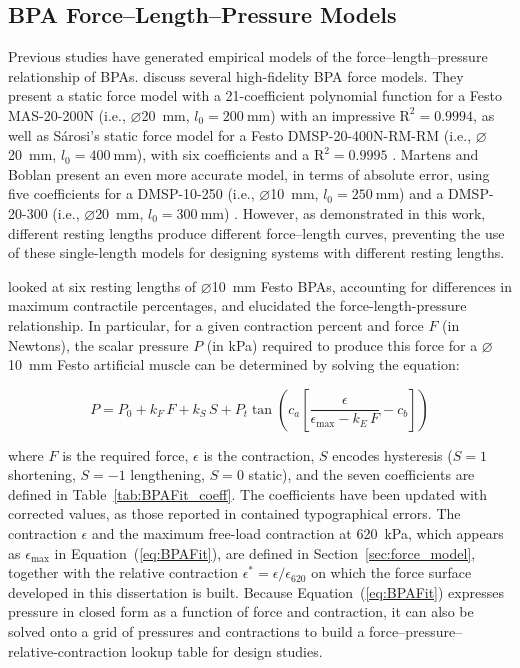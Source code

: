 \subsection{BPA Force--Length--Pressure Models}\label{sec:bg_bpamodels}

Previous studies have generated empirical models of the force--length--pressure relationship of BPAs. \citet{sarosi_comparative_2017} discuss several high-fidelity BPA force models. They present a static force model with a 21-coefficient polynomial function for a Festo MAS-20-200N (i.e., $\diameter$\qty{20}{\mm}, $l_0=\qty{200}{\mm}$) with an impressive $\text{R}^2=0.9994$, as well as S\'arosi's static force model for a Festo DMSP-20-400N-RM-RM (i.e., $\diameter$\qty{20}{\mm}, $l_0=\qty{400}{\mm}$), with six coefficients and a $\text{R}^2=0.9995$ \citep{sarosi_new_2012, sarosi_investigation_2013}. Martens and Boblan present an even more accurate model, in terms of absolute error, using five coefficients for a DMSP-10-250 (i.e., $\diameter$\qty{10}{\mm}, $l_0=\qty{250}{\mm}$) and a DMSP-20-300 (i.e., $\diameter$\qty{20}{\mm}, $l_0=\qty{300}{\mm}$) \citep{martens_modeling_2017}. However, as demonstrated in this work, different resting lengths produce different force--length curves, preventing the use of these single-length models for designing systems with different resting lengths.

\citet{hunt_modeling_2017} looked at six resting lengths of $\diameter$\qty{10}{\mm} Festo BPAs, accounting for differences in maximum contractile percentages, and elucidated the force-length-pressure relationship. In particular, for a given contraction percent and force $F$ (in Newtons), the scalar pressure $P$ (in kPa) required to produce this force for a $\diameter$\qty{10}{\mm} Festo artificial muscle can be determined by solving the equation:

\begin{equation}
P = P_{0} + k_{F}\,F + k_{S}\,S + P_{t}\tan\!\left(c_{a}\left[\frac{\epsilon}{\epsilon_{\max} - k_{E}\,F} - c_{b}\right]\right) \label{eq:BPAFit}
\end{equation}

\noindent
where $F$ is the required force, $\epsilon$ is the contraction, $S$ encodes hysteresis ($S=1$ shortening, $S=-1$ lengthening, $S=0$ static), and the seven coefficients are defined in Table~\ref{tab:BPAFit_coeff}. The coefficients have been updated with corrected values, as those reported in \citet{hunt_modeling_2017} contained typographical errors. The contraction $\epsilon$ and the maximum free-load contraction at \qty{620}{\kPa}, which appears as $\epsilon_{\max}$ in Equation~(\ref{eq:BPAFit}), are defined in Section~\ref{sec:force_model}, together with the relative contraction $\epsilon^{*} = \epsilon/\epsilon_{620}$ on which the force surface developed in this dissertation is built. Because Equation~(\ref{eq:BPAFit}) expresses pressure in closed form as a function of force and contraction, it can also be solved onto a grid of pressures and contractions to build a force--pressure--relative-contraction lookup table for design studies.

